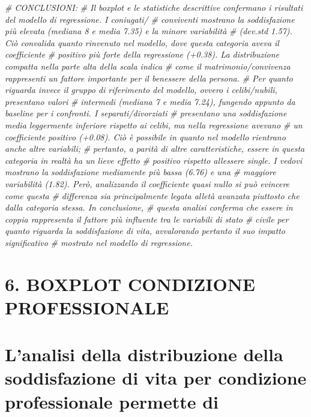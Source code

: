 \documentclass[
]{article}
\newenvironment{Shaded}{\begin{snugshade}}{\end{snugshade}}
\newcommand{\CommentTok}[1]{\textcolor[rgb]{0.56,0.35,0.01}{\textit{#1}}}
\begin{document}
\begin{Shaded}
\begin{Highlighting}[]
\CommentTok{\# CONCLUSIONI:}
\CommentTok{\# Il boxplot e le statistiche descrittive confermano i risultati del modello di regressione. I coniugati/}
\CommentTok{\# conviventi mostrano la soddisfazione più elevata (mediana 8 e media 7.35) e la minore variabilità}
\CommentTok{\# (dev.std 1.57). Ciò convalida quanto rinvenuto nel modello, dove questa categoria aveva il coefficiente}
\CommentTok{\# positivo più forte della regressione (+0.38). La distribuzione compatta nella parte alta della scala indica}
\CommentTok{\# come il matrimonio/convivenza rappresenti un fattore importante per il benessere della persona.}
\CommentTok{\# Per quanto riguarda invece il gruppo di riferimento del modello, ovvero i celibi/nubili, presentano valori}
\CommentTok{\# intermedi (mediana 7 e media 7.24), fungendo appunto da baseline per i confronti. I separati/divorziati}
\CommentTok{\# presentano una soddisfazione media leggermente inferiore rispetto ai celibi, ma nella regressione avevano}
\CommentTok{\# un coefficiente positivo (+0.08). Ciò è possibile in quanto nel modello rientrano anche altre variabili;}
\CommentTok{\# pertanto, a parità di altre caratteristiche, essere in questa categoria in realtà ha un lieve effetto}
\CommentTok{\# positivo rispetto all\textquotesingle{}essere single. I vedovi mostrano la soddisfazione mediamente più bassa (6.76) e una}
\CommentTok{\# maggiore variabilità (1.82). Però, analizzando il coefficiente quasi nullo si può evincere come questa }
\CommentTok{\# differenza sia principalmente legata all\textquotesingle{}età avanzata piuttosto che dalla categoria stessa. In conclusione, \# questa analisi conferma che essere in coppia rappresenta il fattore più influente tra le variabili di stato}
\CommentTok{\# civile per quanto riguarda la soddisfazione di vita, avvalorando pertanto il suo impatto significativo}
\CommentTok{\# mostrato nel modello di regressione.}
\end{Highlighting}
\end{Shaded}

\section{6. BOXPLOT CONDIZIONE
PROFESSIONALE}\label{boxplot-condizione-professionale}

\section{L'analisi della distribuzione della soddisfazione di vita per
condizione professionale permette
di}\label{lanalisi-della-distribuzione-della-soddisfazione-di-vita-per-condizione-professionale-permette-di}
\end{document}
